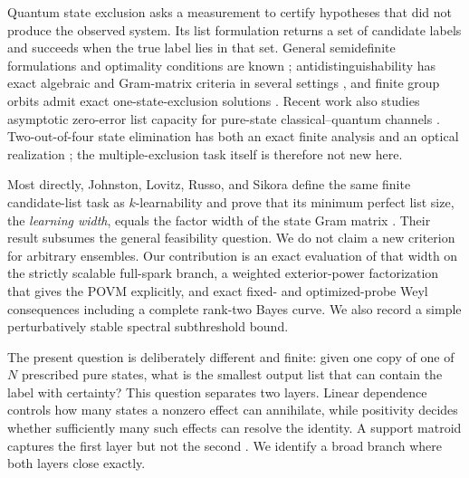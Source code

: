 \documentclass[11pt,a4paper]{article}
\begin{document}
Quantum state exclusion asks a measurement to certify hypotheses that did not
produce the observed system.  Its list formulation returns a set of candidate
labels and succeeds when the true label lies in that set.  General semidefinite
formulations and optimality conditions are known
\cite{Bandyopadhyay2014}; antidistinguishability has exact algebraic and
Gram-matrix criteria in several settings
\cite{HeinosaariKerppo2018,RussoSikora2023,JohnstonRussoSikora2025}, and
finite group orbits admit exact one-state-exclusion solutions
\cite{DiebraEtAl2026}.  Recent work also studies asymptotic zero-error list
capacity for pure-state classical--quantum channels
\cite{DalaiGirardiLami2026}.  Two-out-of-four state elimination has both an
exact finite analysis and an optical realization
\cite{CrickmoreEtAl2020,WebbEtAl2023}; the multiple-exclusion task itself is
therefore not new here.

Most directly, Johnston, Lovitz, Russo, and Sikora define the same finite
candidate-list task as $k$-learnability and prove that its minimum perfect
list size, the \emph{learning width}, equals the factor width of the state
Gram matrix \cite{JohnstonLovitzRussoSikora2025}.  Their result subsumes the
general feasibility question.  We do not claim a new criterion for arbitrary
ensembles.  Our contribution is an exact evaluation of that width on the
strictly scalable full-spark branch, a weighted exterior-power factorization
that gives the POVM explicitly, and exact
fixed- and optimized-probe Weyl consequences including a complete rank-two
Bayes curve.  We also record a simple perturbatively stable spectral
subthreshold bound.

The present question is deliberately different and finite: given one copy of
one of $N$ prescribed pure states, what is the smallest output list that can
contain the label with certainty?  This question separates two layers.
Linear dependence controls how many states a nonzero effect can annihilate,
while positivity decides whether sufficiently many such effects can resolve
the identity.  A support matroid captures the first layer but not the second
\cite{ErikssonMatroidUnion2026}.  We identify a broad branch where both layers
close exactly.
\end{document}

